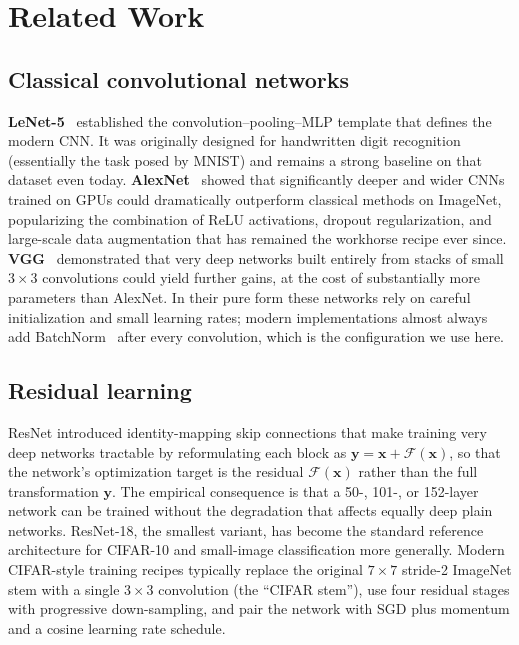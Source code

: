 \documentclass[conference,10pt]{IEEEtran}
\begin{document}
\section{Related Work}
\label{sec:related}

\subsection{Classical convolutional networks}

\textbf{LeNet-5}~\cite{lecun1998gradient} established the
convolution--pooling--MLP template that defines the modern CNN. It was
originally designed for handwritten digit recognition (essentially the
task posed by MNIST) and remains a strong baseline on that dataset
even today. \textbf{AlexNet}~\cite{krizhevsky2012imagenet} showed that
significantly deeper and wider CNNs trained on GPUs could dramatically
outperform classical methods on ImageNet, popularizing the
combination of ReLU activations, dropout regularization, and
large-scale data augmentation that has remained the workhorse recipe
ever since. \textbf{VGG}~\cite{simonyan2015very} demonstrated that
very deep networks built entirely from stacks of small $3\!\times\!3$
convolutions could yield further gains, at the cost of substantially
more parameters than AlexNet. In their pure form these networks rely
on careful initialization and small learning rates; modern
implementations almost always add BatchNorm~\cite{ioffe2015batch}
after every convolution, which is the configuration we use here.

\subsection{Residual learning}

ResNet \cite{he2016deep} introduced identity-mapping skip connections
that make training very deep networks tractable by reformulating each
block as $\mathbf{y}=\mathbf{x}+\mathcal{F}(\mathbf{x})$, so that the
network's optimization target is the residual $\mathcal{F}(\mathbf{x})$
rather than the full transformation $\mathbf{y}$. The empirical
consequence is that a 50-, 101-, or 152-layer network can be trained
without the degradation that affects equally deep plain networks.
ResNet-18, the smallest variant, has become the standard reference
architecture for CIFAR-10 and small-image classification more
generally. Modern CIFAR-style training recipes typically replace the
original $7\!\times\!7$ stride-2 ImageNet stem with a single
$3\!\times\!3$ convolution (the ``CIFAR stem''), use four residual
stages with progressive down-sampling, and pair the network with SGD
plus momentum and a cosine learning rate schedule.
\end{document}
